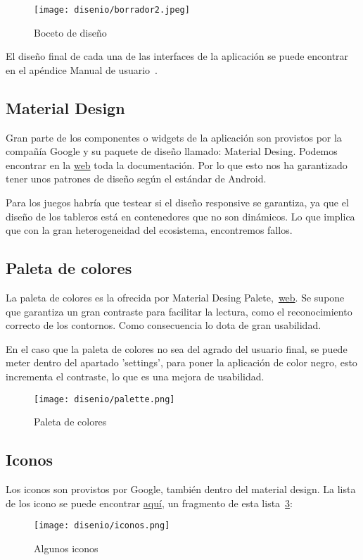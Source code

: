 \begin{figure}[H]
	\centering
	\texttt{[image: disenio/borrador2.jpeg]}
	\caption{Boceto de diseño}\label{fig:borrador}
\end{figure}

El diseño final de cada una de las interfaces de la aplicación se puede encontrar en el apéndice Manual de usuario~\pageref{manualusuario}.

\subsection{Material Design}
Gran parte de los componentes o widgets de la aplicación son provistos por la compañía Google y su paquete de diseño llamado: Material Desing. Podemos encontrar en la \href{https://material.io/develop/flutter}{web} toda la documentación. Por lo que esto nos ha garantizado tener unos patrones de diseño según el estándar de Android. 

Para los juegos habría que testear si el diseño responsive se garantiza, ya que el diseño de los tableros está en contenedores que no son dinámicos. Lo que implica que con la gran heterogeneidad del ecosistema, encontremos fallos.

\subsection{Paleta de colores}
La paleta de colores es la ofrecida por Material Desing Palete,~\href{https://material.io/design/color/the-color-system.html#color-theme-creation}{web}. Se supone que garantiza un gran contraste para facilitar la lectura, como el reconocimiento correcto de los contornos. Como consecuencia lo dota de gran usabilidad.

En el caso que la paleta de colores no sea del agrado del usuario final, se puede meter dentro del apartado 'settings', para poner la aplicación de color negro, esto incrementa el contraste, lo que es una mejora de usabilidad.

\begin{figure}[H]
	\centering
	\texttt{[image: disenio/palette.png]}
	\caption{Paleta de colores}\label{fig:palette}
\end{figure}

\subsection{Iconos}
Los iconos son provistos por Google, también dentro del material design. La lista de los icono se puede encontrar \href{https://material.io/resources/icons/?style=sharp}{aquí}, un fragmento de esta lista~\ref{fig:iconos}:

\begin{figure}[H]
	\centering
	\texttt{[image: disenio/iconos.png]}
	\caption{Algunos iconos}\label{fig:iconos}
\end{figure}


